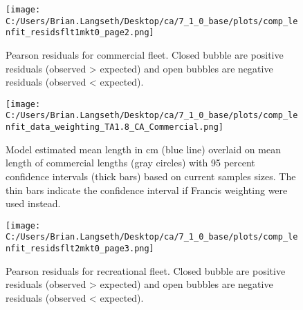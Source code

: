 \documentclass[11pt,
  english,
  a4paper,
]{article}
\begin{document}
\begin{figure}
\centering
\texttt{[image: C:/Users/Brian.Langseth/Desktop/ca/7\_1\_0\_base/plots/comp\_lenfit\_residsflt1mkt0\_page2.png]}
\caption{Pearson residuals for commercial fleet. Closed bubble are positive residuals (observed \textgreater{} expected) and open bubbles are negative residuals (observed \textless{} expected).\label{fig:com-pearson}}
\end{figure}

\tagmcend\tagstructend


\begin{figure}
\centering
\texttt{[image: C:/Users/Brian.Langseth/Desktop/ca/7\_1\_0\_base/plots/comp\_lenfit\_data\_weighting\_TA1.8\_CA\_Commercial.png]}
\caption{Model estimated mean length in cm (blue line) overlaid on mean length of commercial lengths (gray circles) with 95 percent confidence intervals (thick bars) based on current samples sizes. The thin bars indicate the confidence interval if Francis weighting were used instead.\label{fig:com-mean-len-fit}}
\end{figure}

\tagmcend\tagstructend


\begin{figure}
\centering
\texttt{[image: C:/Users/Brian.Langseth/Desktop/ca/7\_1\_0\_base/plots/comp\_lenfit\_residsflt2mkt0\_page3.png]}
\caption{Pearson residuals for recreational fleet. Closed bubble are positive residuals (observed \textgreater{} expected) and open bubbles are negative residuals (observed \textless{} expected).\label{fig:rec-pearson}}
\end{figure}

\tagmcend\tagstructend

\end{document}
